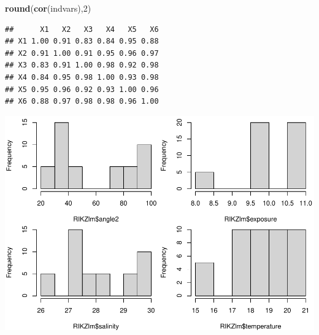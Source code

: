 \documentclass[
]{book}
\newenvironment{Shaded}{\begin{snugshade}}{\end{snugshade}}
\newcommand{\DataTypeTok}[1]{\textcolor[rgb]{0.13,0.29,0.53}{#1}}
\newcommand{\DecValTok}[1]{\textcolor[rgb]{0.00,0.00,0.81}{#1}}
\newcommand{\FloatTok}[1]{\textcolor[rgb]{0.00,0.00,0.81}{#1}}
\newcommand{\KeywordTok}[1]{\textcolor[rgb]{0.13,0.29,0.53}{\textbf{#1}}}
\newcommand{\NormalTok}[1]{#1}
\newcommand{\OperatorTok}[1]{\textcolor[rgb]{0.81,0.36,0.00}{\textbf{#1}}}
\newcommand{\StringTok}[1]{\textcolor[rgb]{0.31,0.60,0.02}{#1}}
\begin{document}
\begin{Shaded}
\begin{Highlighting}[]
\KeywordTok{round}\NormalTok{(}\KeywordTok{cor}\NormalTok{(indvars),}\DecValTok{2}\NormalTok{)}
\end{Highlighting}
\end{Shaded}

\begin{verbatim}
##      X1   X2   X3   X4   X5   X6
## X1 1.00 0.91 0.83 0.84 0.95 0.88
## X2 0.91 1.00 0.91 0.95 0.96 0.97
## X3 0.83 0.91 1.00 0.98 0.92 0.98
## X4 0.84 0.95 0.98 1.00 0.93 0.98
## X5 0.95 0.96 0.92 0.93 1.00 0.96
## X6 0.88 0.97 0.98 0.98 0.96 1.00
\end{verbatim}

\begin{Shaded}
\end{Shaded}

\includegraphics{ECOMODbook_files/figure-latex/unnamed-chunk-14-1.pdf}
\end{document}
